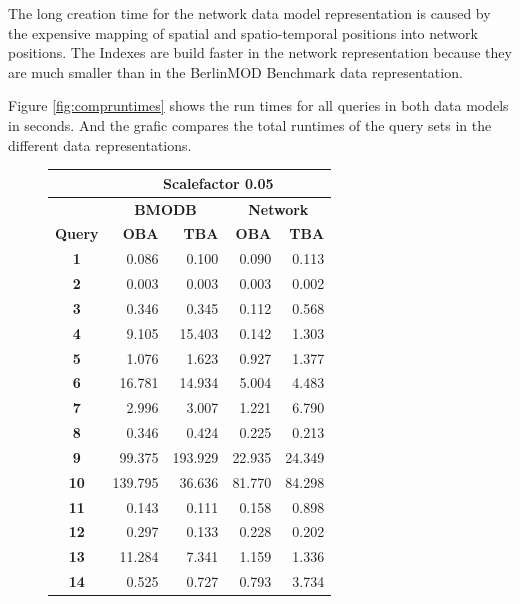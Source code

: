 \documentclass[a4paper]{article}
\newcommand{\bmodb} {BerlinMOD Benchmark}
\begin{document}
The long creation time for the network data model representation is
caused by the expensive mapping of spatial and spatio-temporal positions into
network positions. The Indexes are build faster in the network representation
because they are much smaller than in the \bmodb{} data representation.

Figure \ref{fig:compruntimes} shows the run times for all queries in both data
models in seconds. And the grafic compares the total runtimes of the query sets
in the different data representations.
\begin{figure}[h]
  \begin{minipage}{0.5\linewidth}
    \begin{tiny}
      \begin{tabular}{|c|r|r|r|r|}
        \hline
        &\multicolumn{4}{c|}{\textbf{Scalefactor 0.05}}\\
        \hline
        &\multicolumn{2}{c|}{\textbf{BMODB}}&\multicolumn{2}{c|}{\textbf{Network}}\\
        \hline
        \textbf{Query}&\textbf{OBA}&\textbf{TBA}&\textbf{OBA}&\textbf{TBA}\\
        \hline
        \textbf{1}&0.086&0.100&0.090&0.113\\
        \hline
        \textbf{2}&0.003&0.003&0.003&0.002\\
        \hline
        \textbf{3}&0.346&0.345&0.112&0.568\\
        \hline
        \textbf{4}&9.105&15.403&0.142&1.303\\
        \hline
        \textbf{5}&1.076&1.623&0.927&1.377\\
        \hline
        \textbf{6}&16.781&14.934&5.004&4.483\\
        \hline
        \textbf{7}&2.996&3.007&1.221&6.790\\
        \hline
        \textbf{8}&0.346&0.424&0.225&0.213\\
        \hline
        \textbf{9}&99.375&193.929&22.935&24.349\\
        \hline
        \textbf{10}&139.795&36.636&81.770&84.298\\
        \hline
        \textbf{11}&0.143&0.111&0.158&0.898\\
        \hline
        \textbf{12}&0.297&0.133&0.228&0.202\\
        \hline
        \textbf{13}&11.284&7.341&1.159&1.336\\
        \hline
        \textbf{14}&0.525&0.727&0.793&3.734\\

\end{tabular}
\end{tiny}
\end{minipage}
\end{figure}
\end{document}
